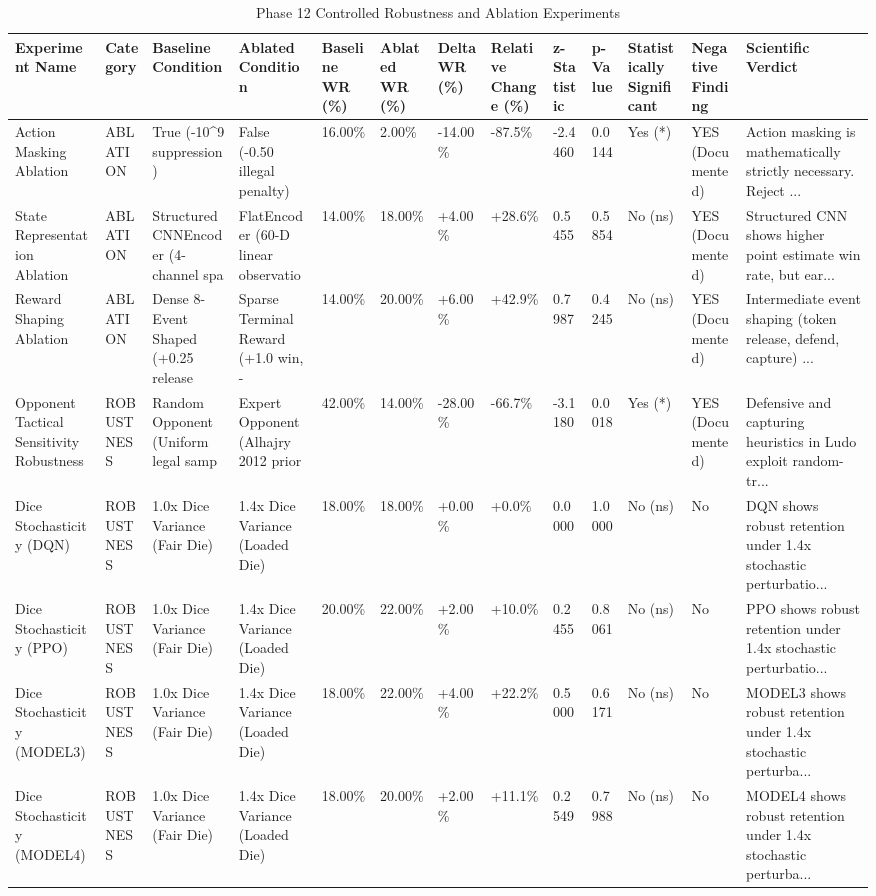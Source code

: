 \begin{table}
\caption{Phase 12 Controlled Robustness and Ablation Experiments}
\label{tab:robustness_ablations}
\begin{tabular}{lllllllllllll}
\toprule
Experiment Name & Category & Baseline Condition & Ablated Condition & Baseline WR (\%) & Ablated WR (\%) & Delta WR (\%) & Relative Change (\%) & z-Statistic & p-Value & Statistically Significant & Negative Finding & Scientific Verdict \\
\midrule
Action Masking Ablation & ABLATION & True (-10\textasciicircum 9 suppression) & False (-0.50 illegal penalty) & 16.00\% & 2.00\% & -14.00\% & -87.5\% & -2.4460 & 0.0144 & Yes (*) & YES (Documented) & Action masking is mathematically strictly necessary. Reject ... \\
State Representation Ablation & ABLATION & StructuredCNNEncoder (4-channel spa & FlatEncoder (60-D linear observatio & 14.00\% & 18.00\% & +4.00\% & +28.6\% & 0.5455 & 0.5854 & No (ns) & YES (Documented) & Structured CNN shows higher point estimate win rate, but ear... \\
Reward Shaping Ablation & ABLATION & Dense 8-Event Shaped (+0.25 release & Sparse Terminal Reward (+1.0 win, - & 14.00\% & 20.00\% & +6.00\% & +42.9\% & 0.7987 & 0.4245 & No (ns) & YES (Documented) & Intermediate event shaping (token release, defend, capture) ... \\
Opponent Tactical Sensitivity Robustness & ROBUSTNESS & Random Opponent (Uniform legal samp & Expert Opponent (Alhajry 2012 prior & 42.00\% & 14.00\% & -28.00\% & -66.7\% & -3.1180 & 0.0018 & Yes (*) & YES (Documented) & Defensive and capturing heuristics in Ludo exploit random-tr... \\
Dice Stochasticity (DQN) & ROBUSTNESS & 1.0x Dice Variance (Fair Die) & 1.4x Dice Variance (Loaded Die) & 18.00\% & 18.00\% & +0.00\% & +0.0\% & 0.0000 & 1.0000 & No (ns) & No & DQN shows robust retention under 1.4x stochastic perturbatio... \\
Dice Stochasticity (PPO) & ROBUSTNESS & 1.0x Dice Variance (Fair Die) & 1.4x Dice Variance (Loaded Die) & 20.00\% & 22.00\% & +2.00\% & +10.0\% & 0.2455 & 0.8061 & No (ns) & No & PPO shows robust retention under 1.4x stochastic perturbatio... \\
Dice Stochasticity (MODEL3) & ROBUSTNESS & 1.0x Dice Variance (Fair Die) & 1.4x Dice Variance (Loaded Die) & 18.00\% & 22.00\% & +4.00\% & +22.2\% & 0.5000 & 0.6171 & No (ns) & No & MODEL3 shows robust retention under 1.4x stochastic perturba... \\
Dice Stochasticity (MODEL4) & ROBUSTNESS & 1.0x Dice Variance (Fair Die) & 1.4x Dice Variance (Loaded Die) & 18.00\% & 20.00\% & +2.00\% & +11.1\% & 0.2549 & 0.7988 & No (ns) & No & MODEL4 shows robust retention under 1.4x stochastic perturba... \\
\bottomrule
\end{tabular}
\end{table}
